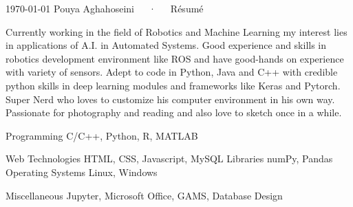 \documentclass[11pt, a4paper]{awesome-cv}
\begin{document}
\makecvheader[C]

\makecvfooter
  {\today}
  {Pouya Aghahoseini~~~·~~~Résumé}
  {\thepage}


\begin{cvparagraph}
	
	Currently working in the field of Robotics and Machine Learning my interest lies in applications of A.I. in Automated Systems. Good experience and skills in robotics development environment like ROS and have good-hands on experience with variety of sensors. Adept to code in Python, Java and C++ with credible python skills in deep learning modules and frameworks like Keras and Pytorch. Super Nerd who loves to customize his computer environment in his own way. Passionate for photography and reading and also love to sketch once in a while.
\end{cvparagraph}


\begin{cvskills}
	\cvskill
	{Programming} %
	{C/C++, Python, R, MATLAB} %
	
	\cvskill
	{Web Technologies} %
	{HTML, CSS, Javascript, MySQL} %
	\cvskill
	{Libraries} %
	{numPy, Pandas} %
	\cvskill
	{Operating Systems} %
	{Linux, Windows}
	
	\cvskill
	{Miscellaneous}
	{Jupyter, Microsoft Office, GAMS, Database Design}%
	
\end{cvskills}
\end{document}
